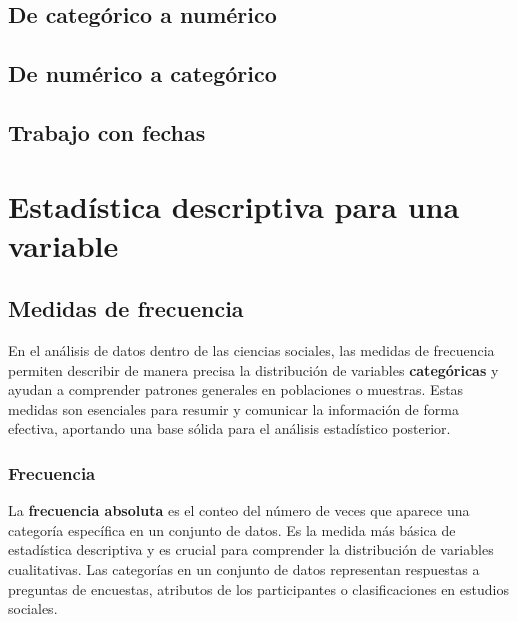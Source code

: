 \documentclass[
  letterpaper,
  DIV=11,
  numbers=noendperiod]{scrreprt}
\begin{document}
\section{De categórico a numérico}\label{de-categuxf3rico-a-numuxe9rico}

\section{De numérico a categórico}\label{de-numuxe9rico-a-categuxf3rico}

\section{Trabajo con fechas}\label{trabajo-con-fechas}

\chapter{Estadística descriptiva para una
variable}\label{estaduxedstica-descriptiva-para-una-variable-1}

\section{Medidas de frecuencia}\label{medidas-de-frecuencia}

En el análisis de datos dentro de las ciencias sociales, las medidas de
frecuencia permiten describir de manera precisa la distribución de
variables \textbf{categóricas} y ayudan a comprender patrones generales
en poblaciones o muestras. Estas medidas son esenciales para resumir y
comunicar la información de forma efectiva, aportando una base sólida
para el análisis estadístico posterior.

\subsection{Frecuencia}\label{frecuencia}

La \textbf{frecuencia absoluta} es el conteo del número de veces que
aparece una categoría específica en un conjunto de datos. Es la medida
más básica de estadística descriptiva y es crucial para comprender la
distribución de variables cualitativas. Las categorías en un conjunto de
datos representan respuestas a preguntas de encuestas, atributos de los
participantes o clasificaciones en estudios sociales.
\end{document}
